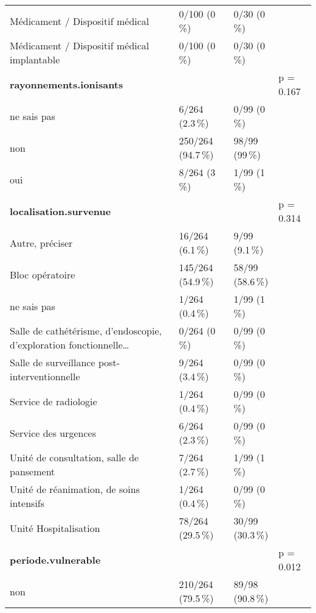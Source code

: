 \documentclass[a4paper,fontsize=10pt,french]{scrartcl}
\begin{document}
\begin{longtable}[t]{l|l|l|l}
Médicament / Dispositif médical & 0/100 (0\,\%) & 0/30 (0\,\%) & \\
 
Médicament / Dispositif médical implantable & 0/100 (0\,\%) & 0/30 (0\,\%) & \\
\midrule
\textbf{rayonnements.ionisants} &  &  & p = 0.167\\
 
ne sais pas & 6/264 (2.3\,\%) & 0/99 (0\,\%) & \\
 
non & 250/264 (94.7\,\%) & 98/99 (99\,\%) & \\
 
oui & 8/264 (3\,\%) & 1/99 (1\,\%) & \\
\midrule
\textbf{localisation.survenue} &  &  & p = 0.314\\
 
Autre, préciser & 16/264 (6.1\,\%) & 9/99 (9.1\,\%) & \\
 
Bloc opératoire & 145/264 (54.9\,\%) & 58/99 (58.6\,\%) & \\
 
ne sais pas & 1/264 (0.4\,\%) & 1/99 (1\,\%) & \\
 
Salle de cathétérisme, d'endoscopie, d'exploration fonctionnelle\dots & 0/264 (0\,\%) & 0/99 (0\,\%) & \\
 
Salle de surveillance post-interventionnelle & 9/264 (3.4\,\%) & 0/99 (0\,\%) & \\
 
Service de radiologie & 1/264 (0.4\,\%) & 0/99 (0\,\%) & \\
 
Service des urgences & 6/264 (2.3\,\%) & 0/99 (0\,\%) & \\
 
Unité de consultation, salle de pansement & 7/264 (2.7\,\%) & 1/99 (1\,\%) & \\
 
Unité de réanimation, de soins intensifs & 1/264 (0.4\,\%) & 0/99 (0\,\%) & \\
 
Unité Hospitalisation & 78/264 (29.5\,\%) & 30/99 (30.3\,\%) & \\
\midrule
\textbf{periode.vulnerable} &  &  & p = 0.012\\
 
non & 210/264 (79.5\,\%) & 89/98 (90.8\,\%) & \\
 

\end{longtable}
\end{document}
